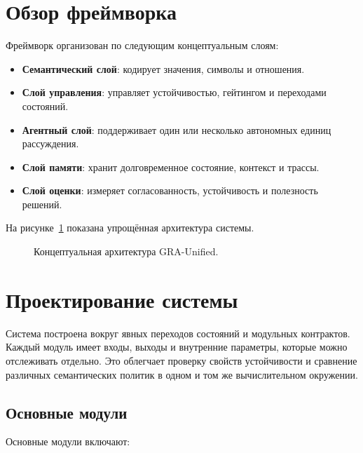 \documentclass[11pt,a4paper]{article}
\begin{document}
\section{Обзор фреймворка}
Фреймворк организован по следующим концептуальным слоям:

\begin{itemize}
    \item \textbf{Семантический слой}: кодирует значения, символы и отношения.
    \item \textbf{Слой управления}: управляет устойчивостью, гейтингом и переходами состояний.
    \item \textbf{Агентный слой}: поддерживает один или несколько автономных единиц рассуждения.
    \item \textbf{Слой памяти}: хранит долговременное состояние, контекст и трассы.
    \item \textbf{Слой оценки}: измеряет согласованность, устойчивость и полезность решений.
\end{itemize}

На рисунке~\ref{fig:architecture} показана упрощённая архитектура системы.

\begin{figure}[H]
    \centering
    \caption{Концептуальная архитектура GRA-Unified.}
    \label{fig:architecture}
\end{figure}

\section{Проектирование системы}
Система построена вокруг явных переходов состояний и модульных контрактов. Каждый модуль имеет входы, выходы и внутренние параметры, которые можно отслеживать отдельно. Это облегчает проверку свойств устойчивости и сравнение различных семантических политик в одном и том же вычислительном окружении.

\subsection{Основные модули}
Основные модули включают:
\end{document}
